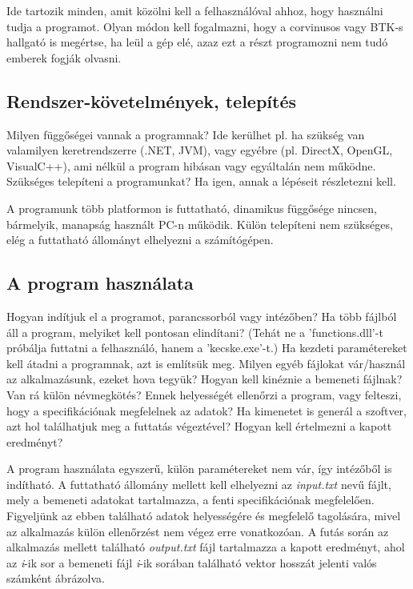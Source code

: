 \documentclass[12pt]{article}
\begin{document}
\begin{itshape}
	Ide tartozik minden, amit közölni kell a felhasználóval ahhoz, hogy használni tudja a programot. Olyan módon kell fogalmazni, hogy a corvinusos vagy BTK-s hallgató is megértse, ha leül a gép elé, azaz ezt a részt programozni nem tudó emberek fogják olvasni.
\end{itshape}

\subsection{Rendszer-követelmények, telepítés}

\begin{itshape}
	Milyen függőségei vannak a programnak? Ide kerülhet pl. ha szükség van valamilyen keretrendszerre (.NET, JVM), vagy egyébre (pl. DirectX, OpenGL, VisualC++), ami nélkül a program hibásan vagy egyáltalán nem működne. Szükséges telepíteni a programunkat? Ha igen, annak a lépéseit részletezni kell.\\
\end{itshape}

A programunk több platformon is futtatható, dinamikus függősége nincsen, bármelyik, manapság használt PC-n működik. Külön telepíteni nem szükséges, elég a futtatható állományt elhelyezni a számítógépen.

\subsection{A program használata}

\begin{itshape}
	 Hogyan indítjuk el a programot, parancssorból vagy intézőben? Ha több fájlból áll a program, melyiket kell pontosan elindítani? (Tehát ne a 'functions.dll'-t próbálja futtatni a felhasználó, hanem a 'kecske.exe'-t.) Ha kezdeti paramétereket kell átadni a programnak, azt is említsük meg. Milyen egyéb fájlokat vár/használ az alkalmazásunk, ezeket hova tegyük? Hogyan kell kinéznie a bemeneti fájlnak? Van rá külön névmegkötés? Ennek helyességét ellenőrzi a program, vagy felteszi, hogy a specifikációnak megfelelnek az adatok? Ha kimenetet is generál a szoftver, azt hol találhatjuk meg a futtatás végeztével? Hogyan kell értelmezni a kapott eredményt?\\
\end{itshape}

A program használata egyszerű, külön paramétereket nem vár, így intézőből is indítható. A futtatható állomány mellett kell elhelyezni az \textit{input.txt} nevű fájlt, mely a bemeneti adatokat tartalmazza, a fenti specifikációnak megfelelően. Figyeljünk az ebben található adatok helyességére és megfelelő tagolására, mivel az alkalmazás külön ellenőrzést nem végez erre vonatkozóan. A futás során az alkalmazás mellett található \textit{output.txt} fájl tartalmazza a kapott eredményt, ahol az \textit{i}-ik sor a bemeneti fájl \textit{i}-ik sorában található vektor hosszát jelenti valós számként ábrázolva.
\end{document}
